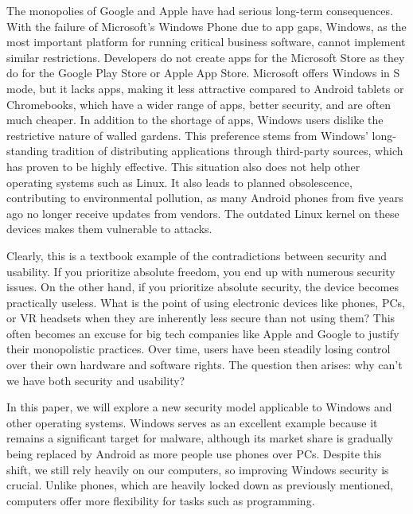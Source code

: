 The monopolies of Google and Apple have had serious long-term consequences. With the failure of Microsoft's Windows Phone due to app gaps, Windows, as the most important platform for running critical business software, cannot implement similar restrictions. Developers do not create apps for the Microsoft Store as they do for the Google Play Store or Apple App Store. Microsoft offers Windows in S mode\cite{MicrosoftSModeFAQ}, but it lacks apps, making it less attractive compared to Android tablets or Chromebooks, which have a wider range of apps, better security, and are often much cheaper. In addition to the shortage of apps, Windows users dislike the restrictive nature of walled gardens\cite{pcgamerUniversalApps, redditRufusUWP}. This preference stems from Windows' long-standing tradition of distributing applications through third-party sources, which has proven to be highly effective. This situation also does not help other operating systems such as Linux. It also leads to planned obsolescence, contributing to environmental pollution, as many Android phones from five years ago no longer receive updates from vendors\cite{androidcentralLinuxKernel}. The outdated Linux kernel on these devices makes them vulnerable to attacks\cite{androidvulnerabilitiesByYear}.

Clearly, this is a textbook example of the contradictions between security and usability. If you prioritize absolute freedom, you end up with numerous security issues. On the other hand, if you prioritize absolute security, the device becomes practically useless. What is the point of using electronic devices like phones, PCs, or VR headsets when they are inherently less secure than not using them? This often becomes an excuse for big tech companies like Apple\cite{apple2021trusted,FederighiPrivacyKeynote2021, Dobie2022, MentalOutlawSideloading2021} and Google to justify their monopolistic practices. Over time, users have been steadily losing control over their own hardware and software rights\cite{win11stop}. The question then arises: why can't we have both security and usability\cite{nistUsersNotStupid}?

In this paper, we will explore a new security model applicable to Windows and other operating systems. Windows serves as an excellent example because it remains a significant target for malware, although its market share is gradually being replaced by Android as more people use phones over PCs. Despite this shift, we still rely heavily on our computers, so improving Windows security is crucial. Unlike phones, which are heavily locked down as previously mentioned, computers offer more flexibility for tasks such as programming.

